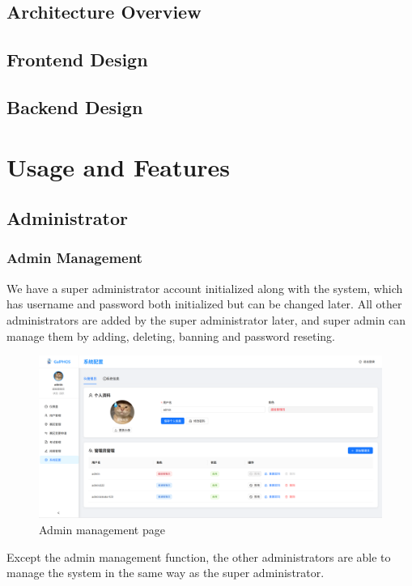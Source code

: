 \documentclass[12pt]{article}
\begin{document}
\subsection{Architecture Overview}
\subsection{Frontend Design}
\subsection{Backend Design}

\section{Usage and Features}
\subsection{Administrator}
\subsubsection{Admin Management}
We have a super administrator account initialized along with the system, which has username and password both initialized but can be changed later. All other administrators are added by
the super administrator later, and super admin can manage them by adding, deleting, banning and password reseting.
\begin{figure}[H]
    \centering
    \includegraphics[width=\textwidth]{admin/adminmanage.png}
    \caption{Admin management page}
    \label{fig:adminmanage page}
\end{figure}

Except the admin management
function, the other administrators are able to manage the system in the same way as the super administrator.
\end{document}
